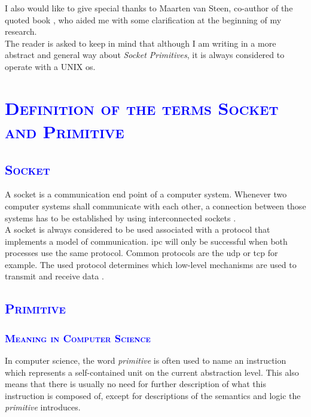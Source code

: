 \documentclass[xcolor=dvipsnames]{article}
\begin{document}
\noindent I also would like to give special thanks to Maarten van Steen, co-author of the quoted book \cite{tanenbaum}, who aided me with some clarification at the beginning of my research.\\

\noindent The reader is asked to keep in mind that although I am writing in a more abstract and general way about \textit{Socket Primitives}, it is always considered to operate with a UNIX \gls{os}.

\section{\scshape{\textcolor{blue}{Definition of the terms Socket and Primitive}}}

\subsection{\scshape{\textcolor{blue}{Socket}}}\label{introduction_socket}

A socket is a communication end point of a computer system. Whenever two computer systems shall communicate with each other, a connection between those systems has to be established by using interconnected sockets \cite[p. 553, ch. 6.5.2]{computer_networks}.\\

\noindent A socket is always considered to be used associated with a protocol that implements a model of communication. \gls{ipc} will only be successful when both processes use the same protocol. Common protocols are the \gls{udp} or \gls{tcp} for example. The used protocol determines which low-level mechanisms are used to transmit and receive data \cite[p. 427 - 427, ch. 16]{GNU_C_library_manual}.

\subsection{\scshape{\textcolor{blue}{Primitive}}}

\subsubsection{\scshape{\textcolor{blue}{Meaning in Computer Science}}}

In computer science, the word \textit{primitive} is often used to name an instruction which represents a self-contained unit on the current abstraction level. This also means that there is usually no need for further description of what this instruction is composed of, except for descriptions of the semantics and logic the \textit{primitive} introduces.\\
\end{document}
